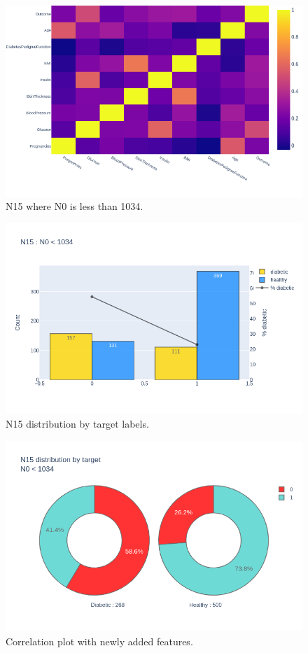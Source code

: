 \documentclass[12pt]{article}
\begin{document}
\begin{figure}[ht]
\centering
\includegraphics[width=1\textwidth]{newplot(3).png}
\caption{N15 where N0 is less than 1034.}
\end{figure}

\begin{figure}[ht]
\centering
\includegraphics[width=1\textwidth]{newplot(40).png}
\caption{N15 distribution by target labels.}
\end{figure}

\begin{figure}[ht]
\centering
\includegraphics[width=1\textwidth]{newplot(41).png}
\caption{Correlation plot with newly added features.}
\end{figure}
\end{document}
